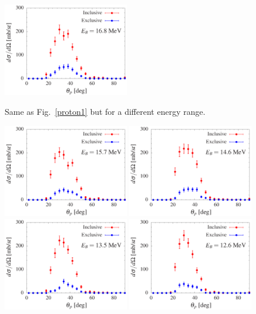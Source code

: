 \documentclass[aps,prc,onecolumn,amsmath,amssymb, preprint, 12pt]{revtex4-1}
\begin{document}
\begin{figure}[!ht]
\includegraphics[width=0.49\textwidth]{ad_180.eps}\\
 \caption{\label{proton2}  Same as Fig.~\ref{proton1} but for a different energy range. }
 \end{figure}
 

 
\begin{figure}[!ht]
\centering
\includegraphics[width=0.49\textwidth]{ad_190.eps}
\includegraphics[width=0.49\textwidth]{ad_200.eps}\\
\includegraphics[width=0.49\textwidth]{ad_210.eps}
\includegraphics[width=0.49\textwidth]{ad_220.eps}\\

\end{figure}
\end{document}
